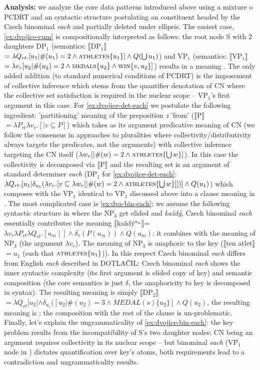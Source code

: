 \documentclass[12pt, a4paper]{scrartcl}
\newcommand{\lb}{\llbracket}
\newcommand{\rb}{\rrbracket}
\newcommand{\sx}[1]{$\lb${#1}$\rb$}
\begin{document}
\textbf{Analysis:} we analyze the core data patterns introduced above using a mixture o PCDRT and an syntactic structure postulating an constituent headed by the Czech binominal \textit{each} and partially deleted under ellipsis. The easiest case, \ref{ex:dvojice-cum} is compositionally interpreted as follows: the root node S with 2 daughters DP$_1$ (semantics: \sx{DP$_1$}$=\lambda Q_{rt}.[u_1| \#(u_1)=2 \wedge \textsc{athletes}\{u_1\}] \wedge Q(\bigcup u_1)$) and VP$_1$ (semantics:
 \sx{VP$_1$}$=\lambda v_r[u_2 | \#(u_2)=2 \wedge \textsc{medals}\{u_2\} \wedge \textsc{win}\{v,u_2\}]$) results in a meaning \NNext[a]. The only added addition (to standard numerical conditions of PCDRT) is the imposement of collective inference which stems from the quantifier denotation of CN where the collective set satisfaction is required in the nuclear scope -- VP$_1$'s first argument in this case. For \ref{ex:dvojice-det-each} we postulate the following ingredient: 'partitioning' meaning of the preposition \textit{z} 'from' (\sx{P}${}=\lambda P_{rt}\lambda v_r.[| v\subseteq P]$) which takes as its argument predicative meaning of CN (we follow the consensus in approaches to pluralities where collectivity/distributivity always targets the predicates, not the arguments) with collective inference targeting the CN itself ($\lambda w_r[|\#(w)=2 \wedge \textsc{athletes}\{\bigcup w\}]$). In this case the collectivity is decomposed via \sx{P} and the resulting set is an argument of standard determiner \textit{each} (DP$_1$ for \ref{ex:dvojice-det-each}: $\lambda Q_{rt}.[u_1|\delta_{u_1}(\lambda v_r.[v \subseteq \lambda w_r[|\#(w)=2 \wedge \textsc{athletes}\{\bigcup w\}]])] \wedge Q(u_1)$) which composes with the VP$_1$ identical to VP$_1$ discussed above into a clause meaning in \NNext[b]. The most complicated case is \ref{ex:dva-bin-each}: we assume the following syntactic structure in \Next where the NP$_3$ get elided and \textit{každý}, Czech binominal \textit{each} essentially contributes the meaning \sx{každý$^{u_m}$}=$\lambda v_r\lambda P_{rt}\lambda Q_{rt}.[u_m\mid] \wedge \delta_{v}(P(u_m)) \wedge Q(u_m)$: it combines with the meaning of NP$_3$ (the argument $\lambda v_r$). The meaning of NP$_3$ is anaphoric to the key (\sx{ten atlet}${}=u_1$ (such that $\textsc{athletes}\{u_1\}$)). In this respect Czech binominal \textit{each} differs from English \textit{each} described in DOTLAČIL: Czech binominal \textit{each} shows the inner syntactic complexity (its first argument is elided copy of key) and semantic composition (the core semantics is just $\delta$, the anaphoricity to key is decomposed in syntax). The resulting meaning is simply \sx{DP$_2$}$=\lambda Q_{rt}[u_2 | \wedge \delta_{u_1}([u_2| \#(u_2)=3 \wedge MEDAL(s)\{u_2\}] \wedge Q(u_2)$, the resulting meaning is \NNext[c]; the composition with the rest of the clause is un-problematic. Finally, let's explain the ungrammaticality of \ref{ex:dvojice-bin-each}: the key problem results from the incompatibility of S's two daughter nodes: CN being an argument requires collectivity in its nuclear scope -- \NNext[d-i] but binominal \textit{each} (VP$_1$ node in \NNext[d-ii]) dictates quantification over key's atoms, both requirements lead to a contradiction and ungrammaticality results.
\end{document}

